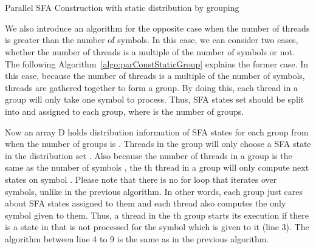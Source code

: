 \documentclass[10pt, conference, compsocconf]{IEEEtran}
\begin{document}
\begin{algorithm}[ht]
    \\
    \\
    
    \caption{Parallel SFA Construction with static distribution by grouping}
    \label{algo:parConstStaticGroup}
\end{algorithm}

We also introduce an algorithm for the opposite case
when the number of threads is greater than the number of symbols. In 
this case, we can consider two cases, whether the
number of threads is a multiple of the number of symbols or not. The
following Algorithm~\ref{algo:parConstStaticGroup} explains the
former case. In this case, because the number of threads is a multiple
of the number of symbols,  threads are gathered together
to form a group. By doing this, each 
thread in a group will only take one symbol to process. Thus, SFA
states set  should be split into  and assigned to each group,
where  is the number of groups. 

Now an array D holds distribution information of SFA states for each group
from  when the number of groups is . Threads in the group
 will only choose a SFA state in the distribution set . Also because
the number of threads in a group is the same as the number of symbols ,
the th thread in a group will only compute next states on symbol .
Please note that there is no for loop that iterates over symbols, unlike in the 
previous algorithm. In other words, each group just cares about SFA
states assigned to them and each thread also computes the only symbol given to
them. Thus, a thread in the th group starts its execution if there is a state
in  that is not processed for the symbol which is given to it (line 3).
The algorithm between line 4 to 9 is the same as in the previous algorithm.
\end{document}
